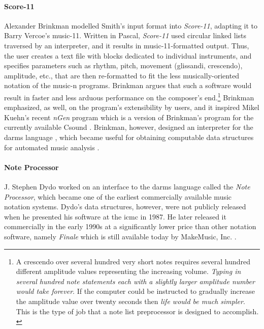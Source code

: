 \paragraph{Score-11}
Alexander Brinkman \parencite{icmc/bbp2372.1981.018} modelled Smith's input format into \textit{Score-11}, adapting it to Barry Vercoe's \gls{music-11}. Written in Pascal, \textit{Score-11} used circular linked lists traversed by an interpreter, and it results in \gls{music-11}-formatted output. Thus, the user creates a text file with blocks dedicated to individual instruments, and specifies parameters such as rhythm, pitch, movement (glissandi, crescendo), amplitude, etc., that are then re-formatted to fit the less musically-oriented notation of the \gls{music-n} programs. Brinkman argues that such a software would result in faster and less arduous performance on the composer's end.\footnote{A crescendo over several hundred very short notes requires several hundred different amplitude values representing the increasing volume. \textit{Typing in several hundred note statements each with a slightly larger amplitude number would take forever}. If the computer could be instructed to gradually increase the amplitude value over twenty seconds then \textit{life would be much simpler}. This is the type of job that a note list preprocessor is designed to accomplish. \im \parencite{score11manual}} Brinkman emphasized, as well, on the program's extensibility by users, and it inspired Mikel Kuehn's recent \textit{nGen} program which is a version of Brinkman's program for the currently available Csound \parencite{csoundMethods}. Brinkman, however, designed an interpreter for the \gls{darms} language \parencite{icmc/bbp2372.1983.002}, which became useful for obtaining computable data structures for automated music analysis \parencite{icmc/bbp2372.1984.033}. 

\paragraph{Note Processor}
J. Stephen Dydo \parencite{icmc/bbp2372.1987.045} worked on an interface to the \gls{darms} language called the \textit{Note Processor}, which became one of the earliest commercially available music notation systems. Dydo's data structures, however, were not publicly released when he presented his software at the \gls{icmc} in 1987. He later released it commercially in the early 1990s at a significantly lower price than other notation software, namely \textit{Finale} which is still available today by MakeMusic, Inc. \parencite{10.2307/941442,10.2307/940555}.

